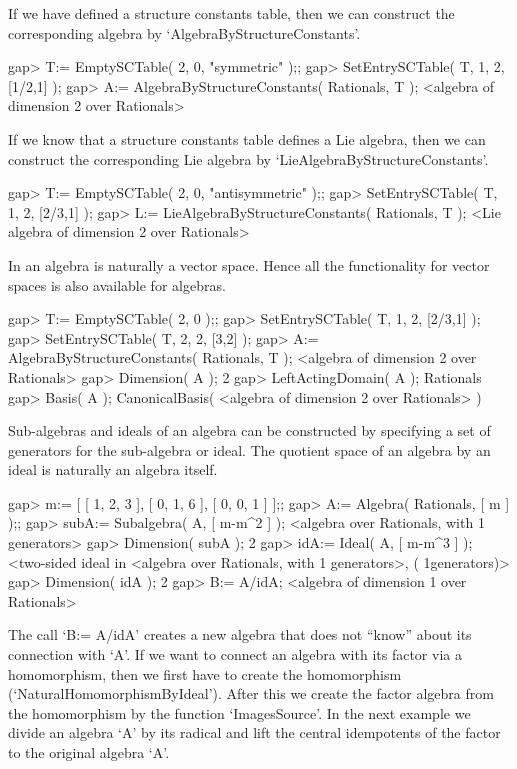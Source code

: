 If we have defined a structure constants table, then we can construct
the corresponding algebra by `AlgebraByStructureConstants'.

\beginexample
gap> T:= EmptySCTable( 2, 0, "symmetric" );;
gap> SetEntrySCTable( T, 1, 2, [1/2,1] );
gap> A:= AlgebraByStructureConstants( Rationals, T );
<algebra of dimension 2 over Rationals>
\endexample

If we know that a structure constants table defines a Lie algebra,
then we can construct the corresponding Lie algebra by
`LieAlgebraByStructureConstants'. 

\beginexample
gap> T:= EmptySCTable( 2, 0, "antisymmetric" );;
gap> SetEntrySCTable( T, 1, 2, [2/3,1] );
gap> L:= LieAlgebraByStructureConstants( Rationals, T );
<Lie algebra of dimension 2 over Rationals>
\endexample

In {\GAP} an algebra is naturally a vector space. Hence all the functionality
for vector spaces is also available for algebras.

\beginexample
gap> T:= EmptySCTable( 2, 0 );;                 
gap> SetEntrySCTable( T, 1, 2, [2/3,1] );
gap> SetEntrySCTable( T, 2, 2, [3,2] );  
gap> A:= AlgebraByStructureConstants( Rationals, T );
<algebra of dimension 2 over Rationals>
gap> Dimension( A );
2
gap> LeftActingDomain( A );
Rationals
gap> Basis( A );
CanonicalBasis( <algebra of dimension 2 over Rationals> )
\endexample

Sub-algebras and ideals of an algebra can be constructed by specifying
a set of generators for the sub-algebra or ideal. The quotient space
of an algebra by an ideal is naturally an algebra itself.

\beginexample
gap> m:= [ [ 1, 2, 3 ], [ 0, 1, 6 ], [ 0, 0, 1 ] ];;
gap> A:= Algebra( Rationals, [ m ] );;
gap> subA:= Subalgebra( A, [ m-m^2 ] );   
<algebra over Rationals, with 1 generators>
gap> Dimension( subA );
2
gap> idA:= Ideal( A, [ m-m^3 ] );
<two-sided ideal in <algebra over Rationals, with 1 generators>, (
1generators)>
gap> Dimension( idA ); 
2
gap> B:= A/idA;
<algebra of dimension 1 over Rationals>
\endexample

The call `B:= A/idA' creates a new algebra that does not ``know'' about
its connection with `A'. If we want to connect an algebra with its factor
via a homomorphism, then we first have to create the homomorphism
(`NaturalHomomorphismByIdeal'). After this we create the factor algebra 
from the homomorphism by the function `ImagesSource'. In the next example
we divide an algebra `A' by its radical and lift the central idempotents
of the factor to the original algebra `A'.

